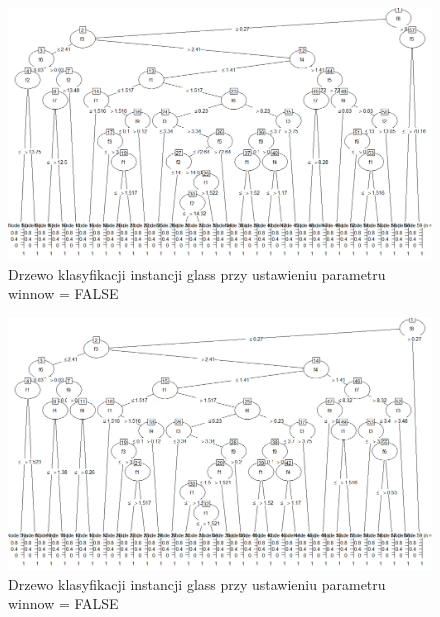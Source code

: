 \documentclass[12pt,a4paper]{article}
\begin{document}
\begin{figure}[H]
\centering
\includegraphics[width=1\textwidth]{glassWinnow_FALSE.png}
\caption{Drzewo klasyfikacji instancji glass przy ustawieniu parametru winnow = FALSE}
\end{figure}

\begin{figure}[H]
\centering
\includegraphics[width=1\textwidth]{glassWinnow_TRUE.png}
\caption{Drzewo klasyfikacji instancji glass przy ustawieniu parametru winnow = FALSE}
\end{figure}
\end{document}
